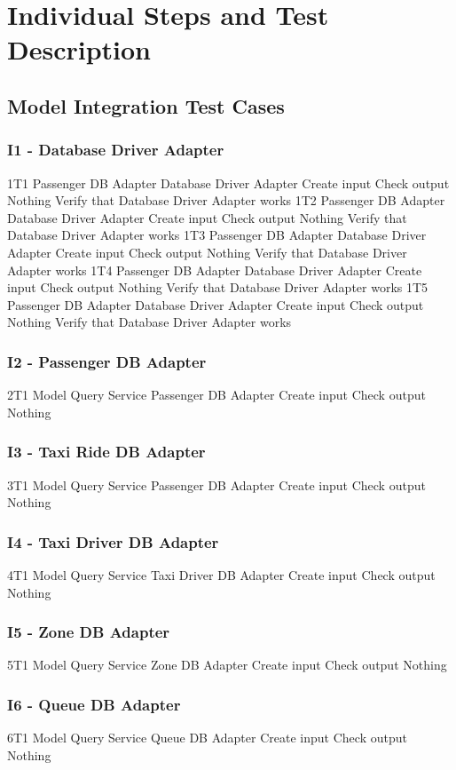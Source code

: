 \section{Individual Steps and Test Description}

\subsection{Model Integration Test Cases}
\subsubsection{I1 - Database Driver Adapter}
\testCase
	{1T1}
	{Passenger DB Adapter}
	{Database Driver Adapter}
	{Create input}
	{Check output}
	{Nothing}
	{Verify that Database Driver Adapter works}
\testCase
	{1T2}
	{Passenger DB Adapter}
	{Database Driver Adapter}
	{Create input}
	{Check output}
	{Nothing}
	{Verify that Database Driver Adapter works}
\testCase
	{1T3}
	{Passenger DB Adapter}
	{Database Driver Adapter}
	{Create input}
	{Check output}
	{Nothing}
	{Verify that Database Driver Adapter works}
\testCase
	{1T4}
	{Passenger DB Adapter}
	{Database Driver Adapter}
	{Create input}
	{Check output}
	{Nothing}
	{Verify that Database Driver Adapter works}
\testCase
	{1T5}
	{Passenger DB Adapter}
	{Database Driver Adapter}
	{Create input}
	{Check output}
	{Nothing}
	{Verify that Database Driver Adapter works}
\subsubsection{I2 - Passenger DB Adapter}
\testCase
	{2T1}
	{Model Query Service}
	{Passenger DB Adapter}
	{Create input}
	{Check output}
	{Nothing}
	{}
\subsubsection{I3 - Taxi Ride DB Adapter}
\testCase
	{3T1}
	{Model Query Service}
	{Passenger DB Adapter}
	{Create input}
	{Check output}
	{Nothing}
	{}
\subsubsection{I4 - Taxi Driver DB Adapter}
\testCase
	{4T1}
	{Model Query Service}
	{Taxi Driver DB Adapter}
	{Create input}
	{Check output}
	{Nothing}
	{}
\subsubsection{I5 - Zone DB Adapter}
\testCase
	{5T1}
	{Model Query Service}
	{Zone DB Adapter}
	{Create input}
	{Check output}
	{Nothing}
	{}
\subsubsection{I6 - Queue DB Adapter}
\testCase
	{6T1}
	{Model Query Service}
	{Queue DB Adapter}
	{Create input}
	{Check output}
	{Nothing}
	{}